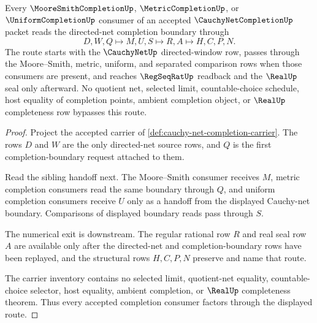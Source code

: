 \begin{theorem}
\label{thm:cauchy-net-completion-moore-smith-handoff}
Every $\MooreSmithCompletionUp$, $\MetricCompletionUp$, or $\UniformCompletionUp$ consumer of an accepted $\CauchyNetCompletionUp$ packet reads the directed-net completion boundary through
$$
D,W,Q \longmapsto M,U,S \longmapsto R,A \longmapsto H,C,P,N .
$$
The route starts with the $\CauchyNetUp$ directed-window row, passes through the Moore--Smith, metric, uniform, and separated comparison rows when those consumers are present, and reaches $\RegSeqRatUp$ readback and the $\RealUp$ seal only afterward. No quotient net, selected limit, countable-choice schedule, host equality of completion points, ambient completion object, or $\RealUp$ completeness row bypasses this route.
\end{theorem}
\begin{proof}
Project the accepted carrier of \autoref{def:cauchy-net-completion-carrier}. The rows $D$ and $W$ are the only directed-net source rows, and $Q$ is the first completion-boundary request attached to them.

Read the sibling handoff next. The Moore--Smith consumer receives $M$, metric completion consumers read the same boundary through $Q$, and uniform completion consumers receive $U$ only as a handoff from the displayed Cauchy-net boundary. Comparisons of displayed boundary reads pass through $S$.

The numerical exit is downstream. The regular rational row $R$ and real seal row $A$ are available only after the directed-net and completion-boundary rows have been replayed, and the structural rows $H,C,P,N$ preserve and name that route.

The carrier inventory contains no selected limit, quotient-net equality, countable-choice selector, host equality, ambient completion, or $\RealUp$ completeness theorem. Thus every accepted completion consumer factors through the displayed route.
\end{proof}


